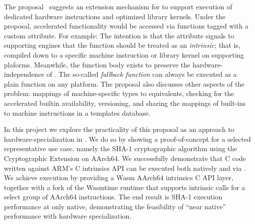 The  proposal~\cite{hw-spec-wasm} suggests an extension
mechanism for \wasm to support execution of dedicated hardware instructions and
optimized library kernels. Under the proposal, accelerated functionality would
be accessed via functions tagged with a custom  attribute. For
example: 
%
%
The intention is that the attribute signals to supporting engines that the
function should be treated as an \emph{intrinsic}; that is, compiled down to a
specific machine instruction or library kernel on supporting plaforms.
Meanwhile, the function body exists to preserve the hardware-independence of
\wasm. The so-called \emph{fallback function} can always be executed as a plain
\wasm function on any platform. The proposal also discusses other aspects of the
problem: mappings of machine-specific types to \wasm equivalents, checking for
the accelerated builtin availability, versioning, and sharing the mappings of
built-ins to machine instructions in a templates database.


In this project we explore the practicality of this proposal as an approach to
hardware-specialization in \wasm. We do so by showing a proof-of-concept for a
selected representative use case, namely the SHA-1 cryptographic algorithm using
the Cryptographic Extension on AArch64. We successfully demonstrate that C code
written against ARM's C intrinsics API can be executed both natively and via
\wasm. We achieve \wasm execution by providing a Wasm AArch64 intrinsics C API
layer, together with a fork of the Wasmtime \wasm runtime that supports
intrinsic calls for a select group of AArch64 instructions. The end result is
SHA-1 execution performance at only \MetricInlineWasmtimeHwwasmDivNative native,
demonstrating the feasibility of ``near native'' performance with hardware
specialization.
